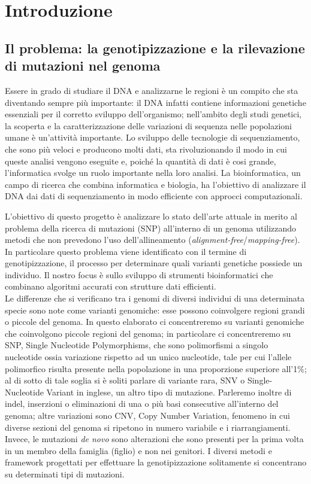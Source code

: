\documentclass[../main.tex]{subfiles}
\begin{document}
\section{Introduzione} 

\subsection{Il problema: la genotipizzazione e la rilevazione di mutazioni nel genoma}

Essere in grado di studiare il DNA e analizzarne le regioni è un compito che sta diventando sempre più importante: il DNA infatti contiene informazioni genetiche essenziali per il corretto sviluppo dell'organismo; nell'ambito degli studi genetici, la scoperta e la caratterizzazione delle variazioni di sequenza nelle popolazioni umane è un'attività importante. Lo sviluppo delle tecnologie di sequenziamento, che sono più veloci e producono molti dati, sta rivoluzionando il modo in cui queste analisi vengono eseguite e, poiché la quantità di dati è cosi grande, l'informatica svolge un ruolo importante nella loro analisi. La bioinformatica, un campo di ricerca che combina informatica e biologia, ha l'obiettivo di analizzare il DNA dai dati di sequenziamento in modo efficiente con approcci computazionali. 

L'obiettivo di questo progetto è analizzare lo stato dell'arte attuale in merito al problema della ricerca di mutazioni (SNP) all'interno di un genoma utilizzando metodi che non prevedono l'uso dell'allineamento (\textit{alignment-free}/\textit{mapping-free}). In particolare questo problema viene identificato con il termine di genotipizzazione, il processo per determinare quali varianti genetiche possiede un individuo. Il nostro focus è sullo sviluppo di strumenti bioinformatici che combinano algoritmi accurati con strutture dati efficienti. \\

\noindent
Le differenze che si verificano tra i genomi di diversi individui di una determinata specie sono note come varianti genomiche: esse possono coinvolgere regioni grandi o piccole del genoma. 
In questo elaborato ci concentreremo su varianti genomiche che coinvolgono piccole regioni del genoma; in particolare ci concentreremo su SNP, Single Nucleotide Polymorphisms, che sono polimorfismi a singolo nucleotide ossia variazione rispetto ad un unico nucleotide, tale per cui l'allele polimorfico risulta presente nella popolazione in una proporzione superiore all'1\%; al di sotto di tale soglia si è soliti parlare di variante rara, SNV o Single-Nucleotide Variant in inglese, un altro tipo di mutazione. Parleremo inoltre di indel, inserzioni o eliminazioni di una o più basi consecutive all'interno del genoma; altre variazioni sono CNV, Copy Number Variation, fenomeno in cui diverse sezioni del genoma si ripetono in numero variabile e i riarrangiamenti. Invece, le mutazioni \textit{de novo} sono alterazioni che sono presenti per la prima volta in un membro della famiglia (figlio) e non nei genitori. I diversi metodi e framework progettati per effettuare la genotipizzazione solitamente si concentrano su determinati tipi di mutazioni.
\end{document}
